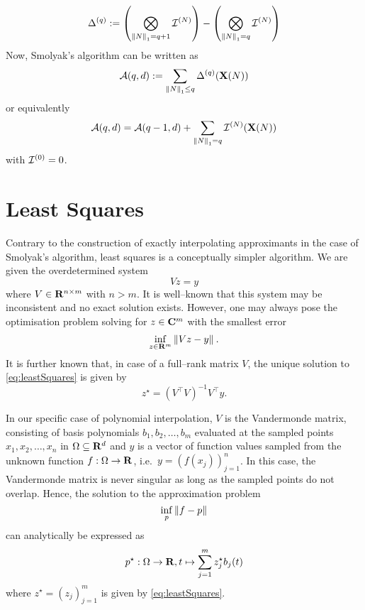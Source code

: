 \documentclass[12pt, oneside]{amsart}
\theoremstyle{definition}
\theoremstyle{remark}
\numberwithin{equation}{section}
\begin{document}
\begin{equation}\label{eq:differenceOp}
    \Delta^{(q)} \defn \left( \bigotimes_{\norm[1]{N}=q+1} \cI^{(N)} \right) - \left( \bigotimes_{\norm[1]{N} = q} \cI^{(N)} \right)
\end{equation}
Now, Smolyak's algorithm can be written as
\begin{equation}\label{eq:SmolyakWithDifferences1}
    \cA(q, d) \defn \sum_{\norm[1]{N} \leq q} \Delta^{(q)}(\XX(N))
\end{equation}
or equivalently
\begin{equation}\label{eq:SmolyakWithDifferences2}
    \cA(q, d) = \cA(q-1, d) + \sum_{\norm[1]{N}=q} \cI^{(N)}(\XX(N))
\end{equation}
with \(\cI^{(0)} = 0\).


\section{Least Squares}

Contrary to the construction of exactly interpolating approximants in the case of Smolyak's algorithm, least squares is a conceptually simpler algorithm. We are given the overdetermined system \[
    Vz = y
\]
where \(V \in \R^{n \times m}\) with \(n > m\). It is well--known that this system may be inconsistent and no exact solution exists. However, one may always pose the optimisation problem solving for \(z \in \C^{m}\) with the smallest error
\begin{equation}\label{eq:leastSquares}
    \inf_{z \in \R^{m}} \norm[]{Vz - y}.
\end{equation}
It is further known that, in case of a full--rank matrix \(V\), the unique solution to \cref{eq:leastSquares} is given by \[
    z^\star = \left(V^\top V\right)^{-1} V^\top y.
\]

In our specific case of polynomial interpolation, \(V\) is the Vandermonde matrix, consisting of basis polynomials \(b_1, b_2, \dots, b_m\) evaluated at the sampled points \(x_1, x_2, \dots, x_n\) in \(\Omega \subseteq \R^d\) and \(y\) is a vector of function values sampled from the unknown function \(f: \Omega \to \R\), i.e.\ \(y = \left(f(x_j)\right)_{j=1}^n\). In this case, the Vandermonde matrix is never singular as long as the sampled points do not overlap.
Hence, the solution to the approximation problem \[
    \inf_{p} \norm[]{f-p}
\]
can analytically be expressed as \[
    p^\star: \Omega \to \R, t \mapsto \sum_{j=1}^m z_j^\star b_j(t)
\]
where \(z^\star = \left(z_j\right)_{j=1}^m\) is given by \cref{eq:leastSquares}.
\end{document}
